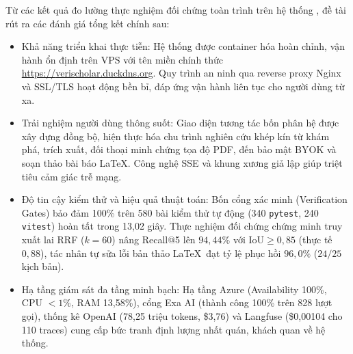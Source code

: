 Từ các kết quả đo lường thực nghiệm đối chứng toàn trình trên hệ thống \VS, đề tài rút ra các đánh giá tổng kết chính sau:
\begin{itemize}[noitemsep, topsep=1pt]
    \item Khả năng triển khai thực tiễn: Hệ thống được container hóa hoàn chỉnh, vận hành ổn định trên VPS với tên miền chính thức \url{https://}\allowbreak\url{verischolar.duckdns.org}. Quy trình an ninh qua reverse proxy Nginx và SSL/TLS hoạt động bền bỉ, đáp ứng vận hành liên tục cho người dùng từ xa.
    \item Trải nghiệm người dùng thông suốt: Giao diện tương tác bốn phân hệ được xây dựng đồng bộ, hiện thực hóa chu trình nghiên cứu khép kín từ khám phá, trích xuất, đối thoại minh chứng tọa độ PDF, đến bảo mật BYOK và soạn thảo bài báo \LaTeX. Công nghệ SSE và khung xương giả lập giúp triệt tiêu cảm giác trễ mạng.
    \item Độ tin cậy kiểm thử và hiệu quả thuật toán: Bốn cổng xác minh (Verification Gates) bảo đảm 100\% trên 580 bài kiểm thử tự động (340 \texttt{pytest}, 240 \texttt{vitest}) hoàn tất trong 13{,}02 giây. Thực nghiệm đối chứng chứng minh truy xuất lai RRF ($k=60$) nâng Recall@5 lên $94{,}44\%$ với $\text{IoU} \ge 0{,}85$ (thực tế $0{,}88$), tác nhân tự sửa lỗi bản thảo \LaTeX\ đạt tỷ lệ phục hồi $96{,}0\%$ ($24/25$ kịch bản).
    \item Hạ tầng giám sát đa tầng minh bạch: Hạ tầng Azure (Availability 100\%, CPU $< 1\%$, RAM 13{,}58\%), cổng Exa AI (thành công 100\% trên 828 lượt gọi), thống kê OpenAI (78{,}25 triệu tokens, \$3{,}76) và Langfuse (\$0{,}00104 cho 110 traces) cung cấp bức tranh định lượng nhất quán, khách quan về hệ thống.
\end{itemize}

